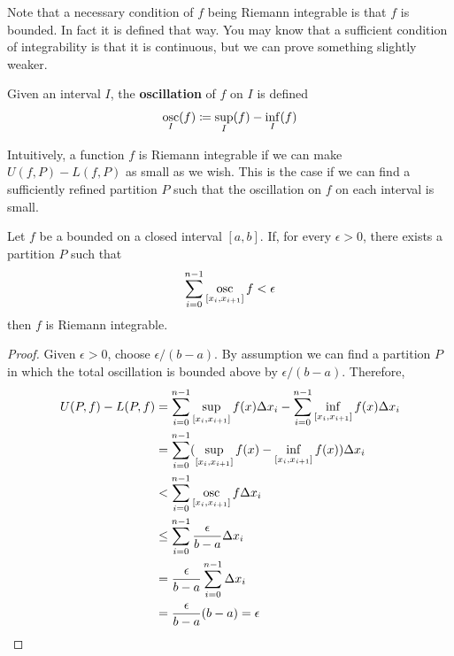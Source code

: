   Note that a necessary condition of $f$ being Riemann integrable is that $f$ is bounded. In fact it is defined that way. You may know that a sufficient condition of integrability is that it is continuous, but we can prove something slightly weaker. 

  \begin{definition}[Oscillation]
    Given an interval $I$, the \textbf{oscillation} of $f$ on $I$ is defined 
    \begin{equation}
      \mathop{\osc}_{I} (f) \coloneqq \sup_I (f) - \inf_I (f)
    \end{equation}
  \end{definition}

  Intuitively, a function $f$ is Riemann integrable if we can make $U(f, P) - L(f, P)$ as small as we wish. This is the case if we can find a sufficiently refined partition $P$ such that the oscillation on $f$ on each interval is small. 

  \begin{lemma}
    Let $f$ be a bounded on a closed interval $[a, b]$. If, for every $\epsilon > 0$, there exists a partition $P$ such that
    \begin{equation}
      \sum_{i=0}^{n-1} \mathop{\osc}_{[x_i, x_{i+1}]} f < \epsilon
    \end{equation}
    then $f$ is Riemann integrable. 
  \end{lemma}
  \begin{proof}
    Given $\epsilon > 0$, choose $\epsilon/(b-a)$. By assumption we can find a partition $P$ in which the total oscillation is bounded above by $\epsilon/(b-a)$. Therefore, 
    \begin{align}
      U(P, f) - L(P, f) & = \sum_{i=0}^{n-1} \sup_{[x_i, x_{i+1}]} f(x) \Delta x_i - \sum_{i=0}^{n-1} \inf_{[x_i, x_{i+1}]} f(x) \Delta x_i \\ 
                        & = \sum_{i=0}^{n-1} (\sup_{[x_i, x_{i+1}]} f(x) - \inf_{[x_i, x_{i+1}]} f(x) ) \Delta x_i \\ 
                        & < \sum_{i=0}^{n-1} \mathop{\osc}_{[x_i, x_{i+1}]} f \Delta x_i \\ 
                        & \leq \sum_{i=0}^{n-1} \frac{\epsilon}{b-a} \Delta x_i \\ 
                        & = \frac{\epsilon}{b-a} \sum_{i=0}^{n-1} \Delta x_i \\
                        & = \frac{\epsilon}{b-a} (b-a) = \epsilon
    \end{align}
  \end{proof} 

